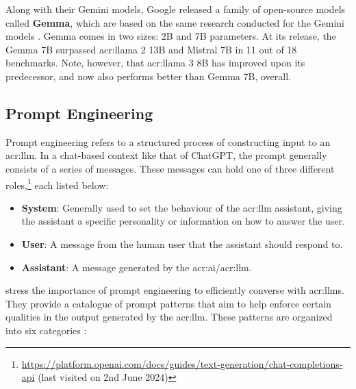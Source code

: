 Along with their Gemini models, Google released a family of open-source models called \textbf{Gemma}, which are based on the same research conducted for the Gemini models \citep{gemmateamGemmaOpenModels2024}. Gemma comes in two sizes: 2B and 7B parameters. At its release, the Gemma 7B surpassed \acrshort{acr:llama} 2 13B and Mistral 7B in 11 out of 18 benchmarks. Note, however, that \acrshort{acr:llama} 3 8B has improved upon its predecessor, and now also performs better than Gemma 7B, overall.


\subsection{Prompt Engineering}
\label{subsec:prompt-engineering}

Prompt engineering refers to a structured process of constructing input to an \acrshort{acr:llm}. In a chat-based context like that of ChatGPT, the prompt generally consists of a series of messages. These messages can hold one of three different roles,\footnote{\url{https://platform.openai.com/docs/guides/text-generation/chat-completions-api} (last visited on 2nd June 2024)} each listed below:

\begin{itemize}
    \item \textbf{System}: Generally used to set the behaviour of the \acrshort{acr:llm} assistant, giving the assistant a specific personality or information on how to answer the user.
    \item \textbf{User}: A message from the human user that the assistant should respond to.
    \item \textbf{Assistant}: A message generated by the \acrshort{acr:ai}/\acrshort{acr:llm}.
\end{itemize}

\cite{whitePromptPatternCatalog2023a} stress the importance of prompt engineering to efficiently converse with \glspl{acr:llm}. They provide a catalogue of prompt patterns that aim to help enforce certain qualities in the output generated by the \gls{acr:llm}. These patterns are organized into six categories \citep[4]{whitePromptPatternCatalog2023a}:


